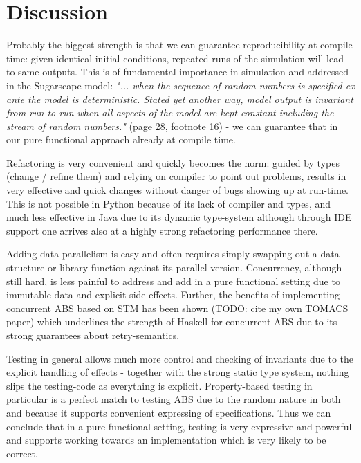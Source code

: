 \section{Discussion}
\label{sec:discussion}
Probably the biggest strength is that we can guarantee reproducibility at compile time: given identical initial conditions, repeated runs of the simulation will lead to same outputs. This is of fundamental importance in simulation and addressed in the Sugarscape model: \textit{"... when the sequence of random numbers is specified ex ante the model is deterministic. Stated yet another way, model output is invariant from run to run when all aspects of the model are kept constant including the stream of random numbers."} (page 28, footnote 16) - we can guarantee that in our pure functional approach already at compile time.

Refactoring is very convenient and quickly becomes the norm: guided by types (change / refine them) and relying on compiler to point out problems, results in very effective and quick changes without danger of bugs showing up at run-time. This is not possible in Python because of its lack of compiler and types, and much less effective in Java due to its dynamic type-system although through IDE support one arrives also at a highly strong refactoring performance there.

Adding data-parallelism is easy and often requires simply swapping out a data-structure or library function against its parallel version. Concurrency, although still hard, is less painful to address and add in a pure functional setting due to immutable data and explicit side-effects. Further, the benefits of implementing concurrent ABS based on STM has been shown (TODO: cite my own TOMACS paper) which underlines the strength of Haskell for concurrent ABS due to its strong guarantees about retry-semantics.

Testing in general allows much more control and checking of invariants due to the explicit handling of effects - together with the strong static type system, nothing slips the testing-code as everything is explicit. Property-based testing in particular is a perfect match to testing ABS due to the random nature in both and because it supports convenient expressing of specifications. Thus we can conclude that in a pure functional setting, testing is very expressive and powerful and supports working towards an implementation which is very likely to be correct.

